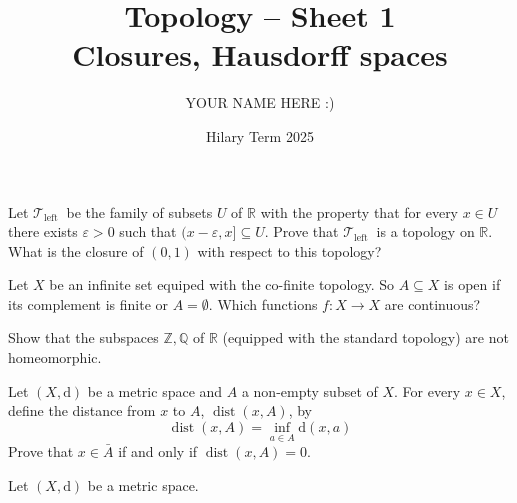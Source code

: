 \documentclass[answers]{exam}
\title{Topology -- Sheet 1\\Closures, Hausdorff spaces}
\author{YOUR NAME HERE :)}
\date{Hilary Term 2025}
\begin{document}
\maketitle

\begin{questions}

\question%
Let $\mathcal{T}_{\text {left }}$ be the family of subsets $U$ of $\mathbb{R}$ with the property that for every $x \in U$ there exists $\varepsilon>0$ such that $(x-\varepsilon, x] \subseteq U$. Prove that $\mathcal{T}_{\text {left }}$ is a topology on $\mathbb{R}$. What is the closure of $(0,1)$ with respect to this topology?



\question%
Let $X$ be an infinite set equiped with the co-finite topology. So $A \subseteq X$ is open if its complement is finite or $A=\emptyset$. Which functions $f: X \to X$ are continuous?



\question%
Show that the subspaces $\mathbb{Z}, \mathbb{Q}$ of $\mathbb{R}$ (equipped with the standard topology) are not homeomorphic.



\question%
Let $(X, \mathrm{d})$ be a metric space and $A$ a non-empty subset of $X$. For every $x \in X$, define the distance from $x$ to $A$, $\operatorname{dist}(x, A)$, by \[
	\operatorname{dist}(x, A)=\inf _{a \in A} \mathrm{d}(x, a)
\] Prove that $x \in \bar{A}$ if and only if $\operatorname{dist}(x, A)=0$.



\question%
Let $(X, \mathrm{d})$ be a metric space.
\end{questions}
\end{document}
